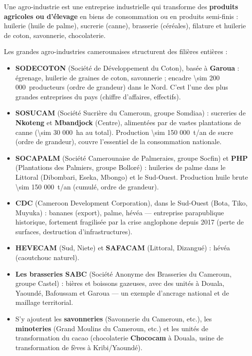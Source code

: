 \documentclass[11pt]{article}
\newcommand{\cle}[1]{{\popxbold\color{popdark}#1}}
\begin{document}
\begin{definition}
Une \cle{agro-industrie} est une entreprise industrielle qui transforme des \textbf{produits agricoles ou d'élevage} en biens de consommation ou en produits semi-finis : huilerie (huile de palme), sucrerie (canne), brasserie (céréales), filature et huilerie de coton, savonnerie, chocolaterie.
\end{definition}

Les grandes agro-industries camerounaises structurent des filières entières :

\begin{itemize}
\item \textbf{SODECOTON} (Société de Développement du Coton), basée à \textbf{Garoua} : égrenage, huilerie de graines de coton, savonnerie ; encadre \SI{\sim 200 000}{producteurs} (ordre de grandeur) dans le Nord. C'est l'une des plus grandes entreprises du pays (chiffre d'affaires, effectifs).
\item \textbf{SOSUCAM} (Société Sucrière du Cameroun, groupe Somdiaa) : sucreries de \textbf{Nkoteng} et \textbf{Mbandjock} (Centre), alimentées par de vastes plantations de canne (\SI{\sim 30 000}{ha} au total). Production \SI{\sim 150 000}{t/an} de sucre (ordre de grandeur), couvre l'essentiel de la consommation nationale.
\item \textbf{SOCAPALM} (Société Camerounaise de Palmeraies, groupe Socfin) et \textbf{PHP} (Plantations des Palmiers, groupe Bolloré) : huileries de palme dans le Littoral (Dibombari, Eseka, Mbongo) et le Sud-Ouest. Production huile brute \SI{\sim 150 000}{t/an} (cumulé, ordre de grandeur).
\item \textbf{CDC} (Cameroon Development Corporation), dans le Sud-Ouest (Bota, Tiko, Muyuka) : bananes (export), palme, hévéa — entreprise parapublique historique, fortement fragilisée par la crise anglophone depuis 2017 (perte de surfaces, destruction d'infrastructures).
\item \textbf{HEVECAM} (Sud, Niete) et \textbf{SAFACAM} (Littoral, Dizangué) : hévéa (caoutchouc naturel).
\item \textbf{Les brasseries SABC} (Société Anonyme des Brasseries du Cameroun, groupe Castel) : bières et boissons gazeuses, avec des unités à Douala, Yaoundé, Bafoussam et Garoua — un exemple d'ancrage national et de maillage territorial.
\item S'y ajoutent les \textbf{savonneries} (Savonnerie du Cameroun, etc.), les \textbf{minoteries} (Grand Moulins du Cameroun, etc.) et les unités de transformation du cacao (chocolaterie \textbf{Chococam} à Douala, usine de transformation de fèves à Kribi/Yaoundé).
\end{itemize}
\end{document}
